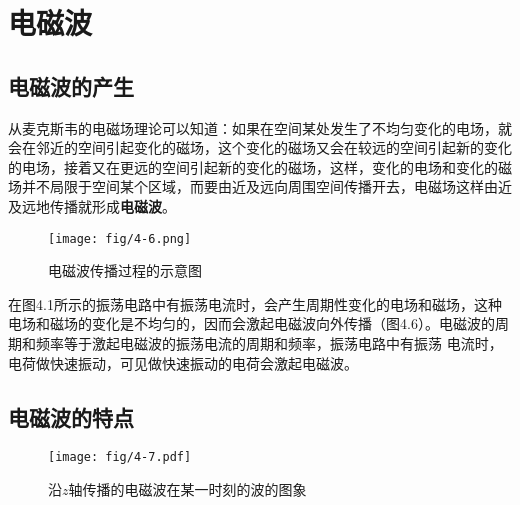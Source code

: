 \section{电磁波}
\subsection{电磁波的产生}

从麦克斯韦的电磁场理论可以知道：如果在空间某处发生了不均匀变化的电场，就会在邻近的空间引起变化的磁场，这个变化的磁场又会在较远的空间引起新的变化的电场，接着又在更远的空间引起新的变化的磁场，这样，变化的电场和变化的磁场并不局限于空间某个区域，而要由近及远向周围空间传播开去，电磁场这样由近及远地传播就形成\textbf{电磁波}。
\begin{figure}[htp]\centering
\texttt{[image: fig/4-6.png]}
\caption{电磁波传播过程的示意图}
\end{figure}

在图4.1所示的振荡电路中有振荡电流时，会产生周期性变化的电场和磁场，这种电场和磁场的变化是不均匀的，因而会激起电磁波向外传播（图4.6）。电磁波的周期和频率等于激起电磁波的振荡电流的周期和频率，振荡电路中有振荡
电流时，电荷做快速振动，可见做快速振动的电荷会激起电磁波。

\subsection{电磁波的特点}
\begin{figure}[htp]\centering
\texttt{[image: fig/4-7.pdf]}
\caption{沿$z$轴传播的电磁波在某一时刻的波的图象}
\end{figure}


